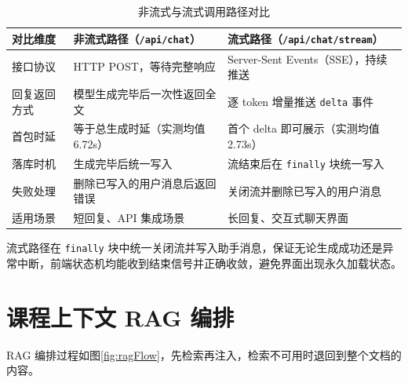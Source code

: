 \documentclass[12pt,a4paper,oneside]{ctexbook}
\numberwithin{equation}{chapter}
\begin{document}
\begin{table}[H]
\centering
\caption{非流式与流式调用路径对比}
\label{tab:streamCompare}
\begin{tabular}{p{3.5cm}p{4.8cm}p{4.8cm}}
\toprule
对比维度 & 非流式路径（\texttt{/api/chat}） & 流式路径（\texttt{/api/chat/stream}） \\
\midrule
接口协议 & HTTP POST，等待完整响应 & Server-Sent Events（SSE），持续推送 \\
回复返回方式 & 模型生成完毕后一次性返回全文 & 逐 token 增量推送 \texttt{delta} 事件 \\
首包时延 & 等于总生成时延（实测均值 6.72s） & 首个 delta 即可展示（实测均值 2.73s） \\
落库时机 & 生成完毕后统一写入 & 流结束后在 \texttt{finally} 块统一写入 \\
失败处理 & 删除已写入的用户消息后返回错误 & 关闭流并删除已写入的用户消息 \\
适用场景 & 短回复、API 集成场景 & 长回复、交互式聊天界面 \\
\bottomrule
\end{tabular}
\end{table}

流式路径在 \texttt{finally} 块中统一关闭流并写入助手消息，保证无论生成成功还是异常中断，前端状态机均能收到结束信号并正确收敛，避免界面出现永久加载状态。

\section{课程上下文 RAG 编排}
RAG 编排过程如图\ref{fig:ragFlow}，先检索再注入，检索不可用时退回到整个文档的内容。
\end{document}
